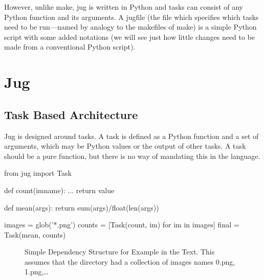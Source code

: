 \documentclass{article}
\begin{document}
However, unlike make, jug is written in Python and tasks can consist of any
Python function and its arguments. A jugfile (the file which specifies which
tasks need to be run---named by analogy to the makefiles of make) is a simple
Python script with some added notations (we will see just how little changes
need to be made from a conventional Python script).

\section{Jug}
\subsection{Task Based Architecture}

Jug is designed around tasks. A task is defined as a Python function and a set
of arguments, which may be Python values or the output of other tasks. A task
should be a pure function, but there is no way of mandating this in the
language.

\begin{python}
from jug import Task

def count(imname):
    ...
    return value

def mean(args):
    return sum(args)/float(len(args))

images = glob('*.png')
counts = [Task(count, im) for im in images]
final = Task(mean, counts)
\end{python}

\begin{figure}
\begin{center}

\end{center}
\caption{Simple Dependency Structure for Example in the Text. This assumes that
the directory had a collection of images names 0.png, 1.png,\ldots}
\label{fig:jug-deps}
\end{figure}
\end{document}
